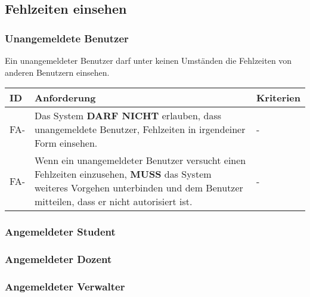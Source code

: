 \newpage

\subsection{Fehlzeiten einsehen}

\subsubsection{Unangemeldete Benutzer}
Ein unangemeldeter Benutzer darf unter keinen Umständen die Fehlzeiten von anderen Benutzern einsehen.

\vspace{12pt}

\begin{tabular} {|p{}|p{11cm}|p{}|}
	\hline
	ID & Anforderung & Kriterien \\
	\hline
	FA-
	& Das System \textbf{DARF NICHT} erlauben, dass unangemeldete Benutzer, Fehlzeiten in irgendeiner Form einsehen. 
	& - \\
	\hline
	FA-
	& Wenn ein unangemeldeter Benutzer versucht einen Fehlzeiten einzusehen, \textbf{MUSS} das System weiteres Vorgehen unterbinden und dem Benutzer mitteilen, dass er nicht autorisiert ist.
	& - \\ 
	\hline
\end{tabular}

\subsubsection{Angemeldeter Student}

\subsubsection{Angemeldeter Dozent}

\subsubsection{Angemeldeter Verwalter}

\newpage

